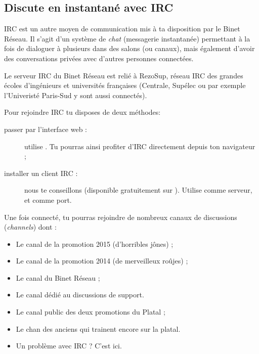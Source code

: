 %
\subsection{Discute en instantané avec IRC}

\label{irc}

IRC est un autre moyen de communication mis à ta disposition par le Binet Réseau.
Il s'agit d'un système de \emph{chat} (messagerie instantanée) permettant à la fois de dialoguer à plusieurs dans des salons (ou canaux),
mais également d'avoir des conversations privées avec d'autres personnes connectées.


Le serveur IRC du Binet Réseau est relié à RezoSup, réseau IRC des grandes écoles d'ingénieurs et universités françaises (Centrale, Supélec ou par exemple l'Univeristé Paris-Sud y sont aussi connectés).

Pour rejoindre IRC tu disposes de deux méthodes:

                  
\begin{description}
  \item[passer par l'interface web :] utilise . Tu pourras ainsi profiter d'IRC directement depuis ton navigateur ;
  \item[installer un client IRC :] nous te conseillons  (disponible gratuitement sur \linebreak {}). Utilise   comme serveur, et  comme port.
\end{description}

 
Une fois connecté, tu pourras rejoindre de nombreux canaux de discussions (\emph{channels}) dont :
\begin{itemize}
  \item {} Le canal de la promotion 2015 (d'horribles jônes) ;
   \item {} Le canal de la promotion 2014 (de merveilleux roûjes) ;
  \item {} Le canal du Binet Réseau ;
  \item {} Le canal dédié au discussions de support.
  \item {} Le canal public des deux promotions du Platal ;
  \item {} Le chan des anciens qui trainent encore sur la platal.
  \item {} Un problème avec IRC ? C'est ici.
\end{itemize}

